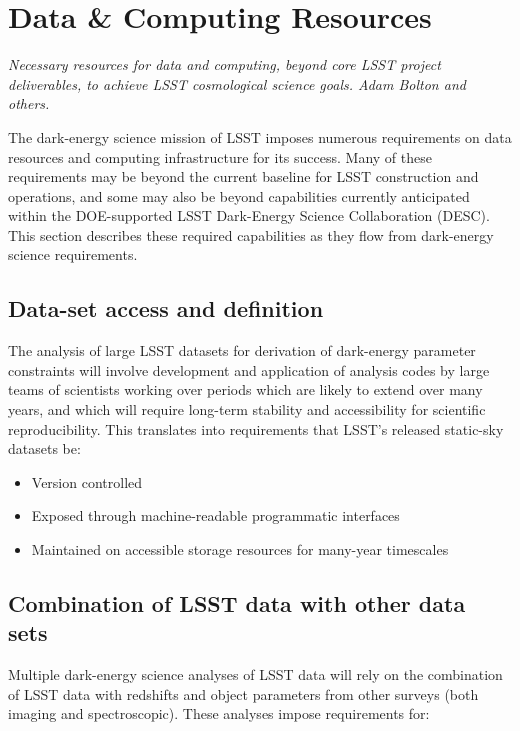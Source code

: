 \section{Data \& Computing Resources}
\label{sec:datacomp}

{\it Necessary resources for data and computing, beyond core LSST project deliverables, to achieve LSST cosmological science goals. Adam Bolton and others.}

The dark-energy science mission of LSST imposes numerous requirements on 
data resources and computing infrastructure for its success. Many of these requirements 
may be beyond the current baseline for LSST construction 
and operations, and some may also be beyond capabilities currently 
anticipated within the DOE-supported LSST Dark-Energy Science Collaboration (DESC)\@.
This section describes these required capabilities as they flow from dark-energy 
science requirements.

\subsection{Data-set access and definition}

The analysis of large LSST datasets for derivation of dark-energy parameter constraints 
will involve development and application of analysis codes by large teams of 
scientists working over periods which are likely to extend over many years, and which will 
require long-term stability and accessibility for scientific reproducibility. This translates 
into requirements that LSST's released static-sky datasets be: 

\begin{itemize}
\item Version controlled
\item Exposed through machine-readable programmatic interfaces
\item Maintained on accessible storage resources for many-year timescales
\end{itemize}

\subsection{Combination of LSST data with other data sets}

Multiple dark-energy science analyses of LSST data will rely on the combination 
of LSST data with redshifts and object parameters from other surveys (both imaging 
and spectroscopic). These analyses impose requirements for: 

